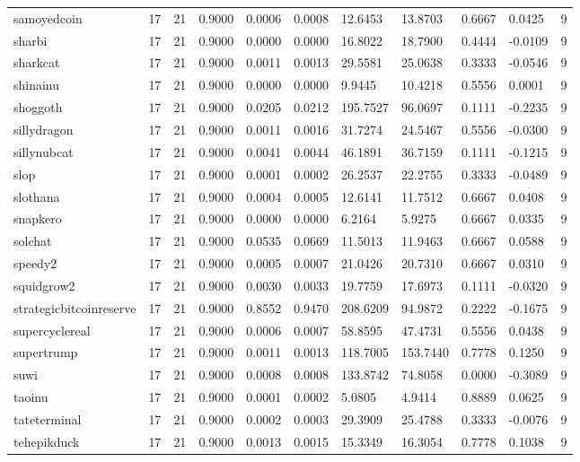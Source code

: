 \begin{table}[htbp]
\begin{tabular}{lllllllllll}
samoyedcoin & 17 & 21 & 0.9000 & 0.0006 & 0.0008 & 12.6453 & 13.8703 & 0.6667 & 0.0425 & 9 \\
sharbi & 17 & 21 & 0.9000 & 0.0000 & 0.0000 & 16.8022 & 18.7900 & 0.4444 & -0.0109 & 9 \\
sharkcat & 17 & 21 & 0.9000 & 0.0011 & 0.0013 & 29.5581 & 25.0638 & 0.3333 & -0.0546 & 9 \\
shinainu & 17 & 21 & 0.9000 & 0.0000 & 0.0000 & 9.9445 & 10.4218 & 0.5556 & 0.0001 & 9 \\
shoggoth & 17 & 21 & 0.9000 & 0.0205 & 0.0212 & 195.7527 & 96.0697 & 0.1111 & -0.2235 & 9 \\
sillydragon & 17 & 21 & 0.9000 & 0.0011 & 0.0016 & 31.7274 & 24.5467 & 0.5556 & -0.0300 & 9 \\
sillynubcat & 17 & 21 & 0.9000 & 0.0041 & 0.0044 & 46.1891 & 36.7159 & 0.1111 & -0.1215 & 9 \\
slop & 17 & 21 & 0.9000 & 0.0001 & 0.0002 & 26.2537 & 22.2755 & 0.3333 & -0.0489 & 9 \\
slothana & 17 & 21 & 0.9000 & 0.0004 & 0.0005 & 12.6141 & 11.7512 & 0.6667 & 0.0408 & 9 \\
snapkero & 17 & 21 & 0.9000 & 0.0000 & 0.0000 & 6.2164 & 5.9275 & 0.6667 & 0.0335 & 9 \\
solchat & 17 & 21 & 0.9000 & 0.0535 & 0.0669 & 11.5013 & 11.9463 & 0.6667 & 0.0588 & 9 \\
speedy2 & 17 & 21 & 0.9000 & 0.0005 & 0.0007 & 21.0426 & 20.7310 & 0.6667 & 0.0310 & 9 \\
squidgrow2 & 17 & 21 & 0.9000 & 0.0030 & 0.0033 & 19.7759 & 17.6973 & 0.1111 & -0.0320 & 9 \\
strategicbitcoinreserve & 17 & 21 & 0.9000 & 0.8552 & 0.9470 & 208.6209 & 94.9872 & 0.2222 & -0.1675 & 9 \\
supercyclereal & 17 & 21 & 0.9000 & 0.0006 & 0.0007 & 58.8595 & 47.4731 & 0.5556 & 0.0438 & 9 \\
supertrump & 17 & 21 & 0.9000 & 0.0011 & 0.0013 & 118.7005 & 153.7440 & 0.7778 & 0.1250 & 9 \\
suwi & 17 & 21 & 0.9000 & 0.0008 & 0.0008 & 133.8742 & 74.8058 & 0.0000 & -0.3089 & 9 \\
taoinu & 17 & 21 & 0.9000 & 0.0001 & 0.0002 & 5.0805 & 4.9414 & 0.8889 & 0.0625 & 9 \\
tateterminal & 17 & 21 & 0.9000 & 0.0002 & 0.0003 & 29.3909 & 25.4788 & 0.3333 & -0.0076 & 9 \\
tehepikduck & 17 & 21 & 0.9000 & 0.0013 & 0.0015 & 15.3349 & 16.3054 & 0.7778 & 0.1038 & 9 \\

\end{tabular}
\end{table}
